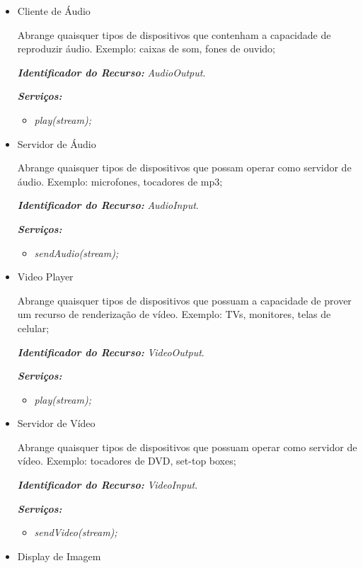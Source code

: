 \begin{itemize}
	\item Cliente de Áudio
		
		Abrange quaisquer tipos de dispositivos que contenham a capacidade de reproduzir áudio. Exemplo: caixas de som, fones de ouvido;

		\emph{\bf{Identificador do Recurso:}} \emph{AudioOutput}.

		\emph{\bf{Serviços:}}
		\begin{itemize}
			\item \emph{play(stream);}
		\end{itemize}

	\item Servidor de Áudio
		
		Abrange quaisquer tipos de dispositivos que possam operar como servidor de áudio. Exemplo: microfones, tocadores de mp3;

		\emph{\bf{Identificador do Recurso:}} \emph{AudioInput}.

		\emph{\bf{Serviços:}} 
		\begin{itemize}
			\item \emph{sendAudio(stream);}
		\end{itemize}

	\item Video Player
		
		Abrange quaisquer tipos de dispositivos que possuam a capacidade de prover um recurso de renderização de vídeo. Exemplo: TVs, monitores, telas de celular;

		\emph{\bf{Identificador do Recurso:}} \emph{VideoOutput}.

		\emph{\bf{Serviços:}} 
		\begin{itemize}
			\item \emph{play(stream);}
		\end{itemize}

	\item Servidor de Vídeo
		
		Abrange quaisquer tipos de dispositivos que possuam operar como servidor de vídeo. Exemplo: tocadores de DVD, set-top boxes;

		\emph{\bf{Identificador do Recurso:}} \emph{VideoInput}.

		\emph{\bf{Serviços:}} 
		\begin{itemize}
			\item \emph{sendVideo(stream);}
		\end{itemize}

	\item Display de Imagem
		

\end{itemize}
